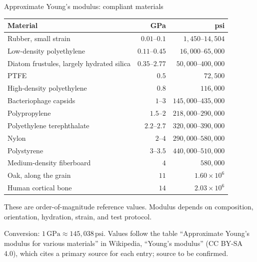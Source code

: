 \documentclass[aspectratio=169,11pt]{beamer}
\begin{document}
\begin{frame}{Approximate Young's modulus: compliant materials}
\footnotesize
\setlength{\tabcolsep}{3pt}
\renewcommand{\arraystretch}{1.0}
\begin{center}
\begin{tabular}{@{}p{}rr@{}}
\toprule
Material & GPa & psi \\
\midrule
Rubber, small strain & $0.01$--$0.1$ & $1{,}450$--$14{,}504$ \\
Low-density polyethylene & $0.11$--$0.45$ & $16{,}000$--$65{,}000$ \\
Diatom frustules, largely hydrated silica & $0.35$--$2.77$ & $50{,}000$--$400{,}000$ \\
PTFE & $0.5$ & $72{,}500$ \\
High-density polyethylene & $0.8$ & $116{,}000$ \\
Bacteriophage capsids & $1$--$3$ & $145{,}000$--$435{,}000$ \\
Polypropylene & $1.5$--$2$ & $218{,}000$--$290{,}000$ \\
Polyethylene terephthalate & $2.2$--$2.7$ & $320{,}000$--$390{,}000$ \\
Nylon & $2$--$4$ & $290{,}000$--$580{,}000$ \\
Polystyrene & $3$--$3.5$ & $440{,}000$--$510{,}000$ \\
Medium-density fiberboard & $4$ & $580{,}000$ \\
Oak, along the grain & $11$ & $1.60\times10^6$ \\
Human cortical bone & $14$ & $2.03\times10^6$ \\
\bottomrule
\end{tabular}
\end{center}
\begin{punchbox}
\small These are order-of-magnitude reference values. Modulus depends on composition, orientation, hydration, strain, and test protocol.
\end{punchbox}
{\tiny\color{DarkGray} Conversion: $1\,\mathrm{GPa}\approx145{,}038\,\mathrm{psi}$. Values follow the table ``Approximate Young's modulus for various materials'' in Wikipedia, ``Young's modulus'' (CC BY-SA 4.0), which cites a primary source for each entry; source to be confirmed.\par}
\end{frame}
\end{document}
